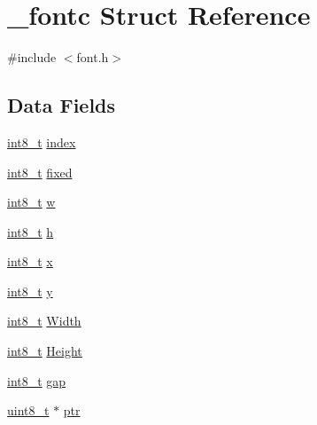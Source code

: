 \hypertarget{struct__fontc}{\section{\-\_\-fontc Struct Reference}
\label{struct__fontc}
}


{\ttfamily \#include $<$font.\-h$>$}

\subsection*{Data Fields}
\begin{DoxyCompactItemize}
\item 
\hyperlink{earth2wireframe_8c_aef44329758059c91c76d334e8fc09700}{int8\-\_\-t} \hyperlink{struct__fontc_a7cc0370744ff7ea964054d36917c9a2f}{index}
\item 
\hyperlink{earth2wireframe_8c_aef44329758059c91c76d334e8fc09700}{int8\-\_\-t} \hyperlink{struct__fontc_aec700f6ada95d1bced81fc2728633878}{fixed}
\item 
\hyperlink{earth2wireframe_8c_aef44329758059c91c76d334e8fc09700}{int8\-\_\-t} \hyperlink{struct__fontc_a9c2af0354d2b2009e7b6684e25fd479b}{w}
\item 
\hyperlink{earth2wireframe_8c_aef44329758059c91c76d334e8fc09700}{int8\-\_\-t} \hyperlink{struct__fontc_a9feb8c838dfc1d4eebb15c8e53981944}{h}
\item 
\hyperlink{earth2wireframe_8c_aef44329758059c91c76d334e8fc09700}{int8\-\_\-t} \hyperlink{struct__fontc_ad15d00ed46ebe52a085cf05b5ca5da90}{x}
\item 
\hyperlink{earth2wireframe_8c_aef44329758059c91c76d334e8fc09700}{int8\-\_\-t} \hyperlink{struct__fontc_aebbde0dc41068722ee1a69f4a56478a4}{y}
\item 
\hyperlink{earth2wireframe_8c_aef44329758059c91c76d334e8fc09700}{int8\-\_\-t} \hyperlink{struct__fontc_ae3c802e1c35ae9a4e37c8eb2e9644325}{Width}
\item 
\hyperlink{earth2wireframe_8c_aef44329758059c91c76d334e8fc09700}{int8\-\_\-t} \hyperlink{struct__fontc_a98f97c237dfb1027c38813a17ef6dcd6}{Height}
\item 
\hyperlink{earth2wireframe_8c_aef44329758059c91c76d334e8fc09700}{int8\-\_\-t} \hyperlink{struct__fontc_a38c23e7e200346fce3777d4efa30488f}{gap}
\item 
\hyperlink{earth2wireframe_8c_aba7bc1797add20fe3efdf37ced1182c5}{uint8\-\_\-t} $\ast$ \hyperlink{struct__fontc_a60a3fef5ccd80dff543aac3f22f74876}{ptr}
\end{DoxyCompactItemize}


